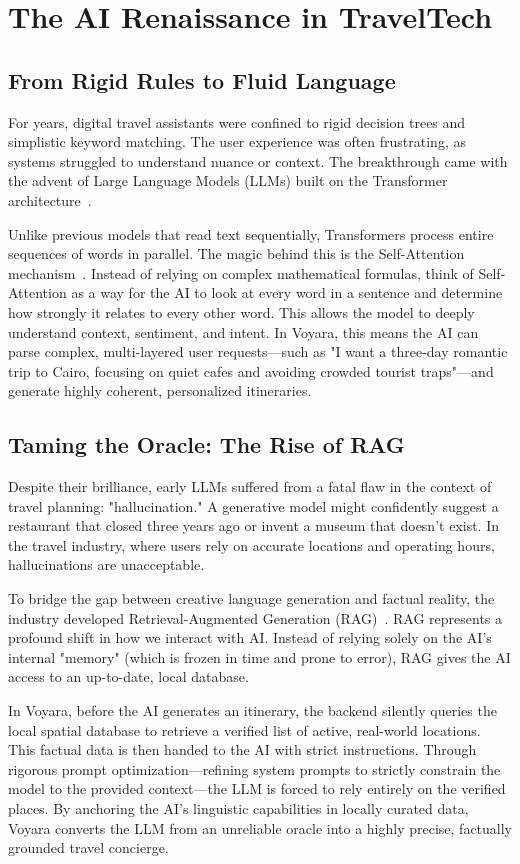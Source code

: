\section{The AI Renaissance in TravelTech}
\subsection{From Rigid Rules to Fluid Language}
For years, digital travel assistants were confined to rigid decision trees and simplistic keyword matching. The user experience was often frustrating, as systems struggled to understand nuance or context. The breakthrough came with the advent of Large Language Models (LLMs) built on the Transformer architecture~\cite{vaswani2017attention}.

Unlike previous models that read text sequentially, Transformers process entire sequences of words in parallel. The magic behind this is the Self-Attention mechanism~\cite{vaswani2017attention}. Instead of relying on complex mathematical formulas, think of Self-Attention as a way for the AI to look at every word in a sentence and determine how strongly it relates to every other word. This allows the model to deeply understand context, sentiment, and intent. In Voyara, this means the AI can parse complex, multi-layered user requests—such as "I want a three-day romantic trip to Cairo, focusing on quiet cafes and avoiding crowded tourist traps"—and generate highly coherent, personalized itineraries.

\subsection{Taming the Oracle: The Rise of RAG}
Despite their brilliance, early LLMs suffered from a fatal flaw in the context of travel planning: "hallucination." A generative model might confidently suggest a restaurant that closed three years ago or invent a museum that doesn't exist. In the travel industry, where users rely on accurate locations and operating hours, hallucinations are unacceptable.

To bridge the gap between creative language generation and factual reality, the industry developed Retrieval-Augmented Generation (RAG)~\cite{lewis2020rag}. RAG represents a profound shift in how we interact with AI. Instead of relying solely on the AI's internal "memory" (which is frozen in time and prone to error), RAG gives the AI access to an up-to-date, local database. 

In Voyara, before the AI generates an itinerary, the backend silently queries the local spatial database to retrieve a verified list of active, real-world locations. This factual data is then handed to the AI with strict instructions. Through rigorous prompt optimization—refining system prompts to strictly constrain the model to the provided context—the LLM is forced to rely entirely on the verified places. By anchoring the AI's linguistic capabilities in locally curated data, Voyara converts the LLM from an unreliable oracle into a highly precise, factually grounded travel concierge.


